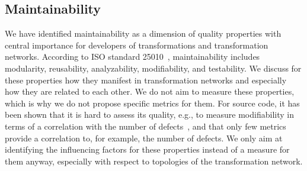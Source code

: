 \subsection{Maintainability}

We have identified maintainability as a dimension of quality properties with central importance for developers of transformations and transformation networks.
According to ISO standard 25010~\cite{iso25010}, maintainability includes modularity, reusability, analyzability, modifiability, and testability.
We discuss for these properties how they manifest in transformation networks and especially how they are related to each other.
We do not aim to measure these properties, which is why we do not propose specific metrics for them.
For source code, it has been shown that it is hard to assess its quality, e.g., to measure modifiability in terms of a correlation with the number of defects~\cite{Gyimothy2005ValidationMetrics-TSE, Yu2002FaultPrediction-ECSMR}, and that only few metrics provide a correlation to, for example, the number of defects.
We only aim at identifying the influencing factors for these properties instead of a measure for them anyway, especially with respect to topologies of the transformation network.

